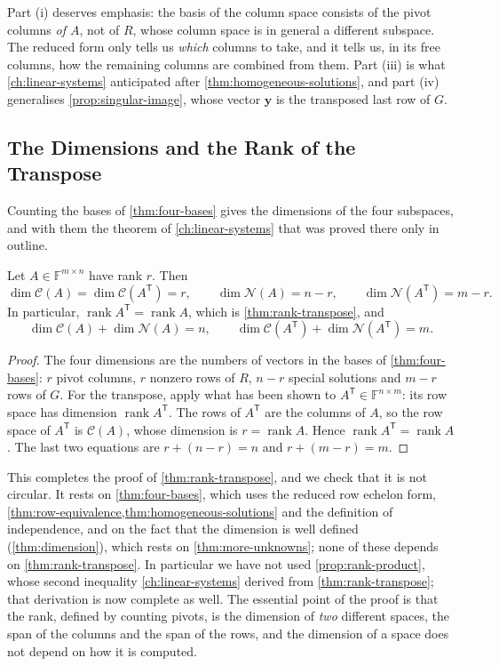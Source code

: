 Part (i) deserves emphasis: the basis of the column space consists of the pivot columns \emph{of $A$}, not of $R$, whose column space is in general a different subspace. The reduced form only tells us \emph{which} columns to take, and it tells us, in its free columns, how the remaining columns are combined from them. Part (iii) is what \cref{ch:linear-systems} anticipated after \cref{thm:homogeneous-solutions}, and part (iv) generalises \cref{prop:singular-image}, whose vector $\mathbf y$ is the transposed last row of $G$.

\subsection{The Dimensions and the Rank of the Transpose}

Counting the bases of \cref{thm:four-bases} gives the dimensions of the four subspaces, and with them the theorem of \cref{ch:linear-systems} that was proved there only in outline.

\begin{theorem}
\label{thm:four-dimensions}
Let $A\in\mathbb F^{m\times n}$ have rank $r$. Then
\[
\dim\mathcal C(A)=\dim\mathcal C(A^{\mathsf T})=r,\qquad\dim\mathcal N(A)=n-r,\qquad\dim\mathcal N(A^{\mathsf T})=m-r .
\]
In particular, $\operatorname{rank}A^{\mathsf T}=\operatorname{rank}A$, which is \cref{thm:rank-transpose}, and
\[
\dim\mathcal C(A)+\dim\mathcal N(A)=n,\qquad\dim\mathcal C(A^{\mathsf T})+\dim\mathcal N(A^{\mathsf T})=m .
\]
\end{theorem}

\begin{proof}
The four dimensions are the numbers of vectors in the bases of \cref{thm:four-bases}: $r$ pivot columns, $r$ nonzero rows of $R$, $n-r$ special solutions and $m-r$ rows of $G$. For the transpose, apply what has been shown to $A^{\mathsf T}\in\mathbb F^{n\times m}$: its row space has dimension $\operatorname{rank}A^{\mathsf T}$. The rows of $A^{\mathsf T}$ are the columns of $A$, so the row space of $A^{\mathsf T}$ is $\mathcal C(A)$, whose dimension is $r=\operatorname{rank}A$. Hence $\operatorname{rank}A^{\mathsf T}=\operatorname{rank}A$. The last two equations are $r+(n-r)=n$ and $r+(m-r)=m$.
\end{proof}

This completes the proof of \cref{thm:rank-transpose}, and we check that it is not circular. It rests on \cref{thm:four-bases}, which uses the reduced row echelon form, \cref{thm:row-equivalence,thm:homogeneous-solutions} and the definition of independence, and on the fact that the dimension is well defined (\cref{thm:dimension}), which rests on \cref{thm:more-unknowns}; none of these depends on \cref{thm:rank-transpose}. In particular we have not used \cref{prop:rank-product}, whose second inequality \cref{ch:linear-systems} derived from \cref{thm:rank-transpose}; that derivation is now complete as well. The essential point of the proof is that the rank, defined by counting pivots, is the dimension of \emph{two} different spaces, the span of the columns and the span of the rows, and the dimension of a space does not depend on how it is computed.

